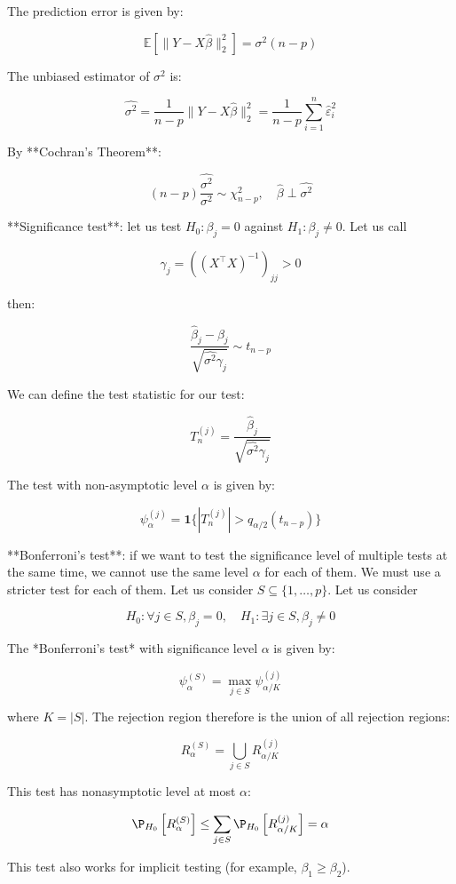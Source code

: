 The prediction error is given by:

$$\mathbb{E}\left[\|Y - X\hat{\beta}\|^2_2\right] = \sigma^2(n - p)$$

The unbiased estimator of $\sigma^2$ is:

$$\hat{\sigma^2} = \frac{1}{n-p}\|Y - X\hat{\beta}\|^2_2 = \frac1{n-p}\sum_{i=1}^n\hat{\varepsilon}_i^2$$

By **Cochran's Theorem**:

$$ (n-p)\frac{\hat{\sigma^2}}{\sigma^2} \sim \chi^2_{n-p}, \quad \hat\beta \perp \hat{\sigma^2}$$

**Significance test**: let us test $H_0: \beta_j = 0$ against $H_1: \beta_j \neq 0$. Let us call

$$\gamma_j = \left((X^\top X)^{-1}\right)_{jj} > 0$$

then:

$$\frac{\hat{\beta}_j- \beta_j}{\sqrt{\hat{\sigma^2}\gamma_j}} \sim t_{n-p}$$

We can define the test statistic for our test:

$$T_n^{(j)} = \frac{\hat{\beta}_j}{\sqrt{\hat{\sigma^2}\gamma_j}}$$

The test with non-asymptotic level $\alpha$ is given by:

$$\psi_\alpha^{(j)} = \textbf{1}\{|T_n^{(j)}| > q_{\alpha/2}(t_{n-p})\}$$

**Bonferroni's test**: if we want to test the significance level of multiple tests at the same time, we cannot use the same level $\alpha$ for each of them. We must use a stricter test for each of them. Let us consider $S \subseteq \{1, \ldots, p\}$. Let us consider

$$H_0: \forall j \in S, \beta_j = 0, \quad H_1: \exists j \in S, \beta_j \neq 0$$

The *Bonferroni's test* with significance level $\alpha$ is given by:

$$\psi_\alpha^{(S)} = \max_{j \in S}\psi_{\alpha/K}^{(j)}$$

where $K = |S|$. The rejection region therefore is the union of all rejection regions:

$$R_\alpha^{(S)} = \bigcup_{j \in S}R_{\alpha/K}^{(j)}$$

This test has nonasymptotic level at most $\alpha$:

$$\P_{H_0}\left[R_\alpha^{(S)}\right] \leq \sum_{j\in S}\P_{H_0}\left[R_{\alpha/K}^{(j)}\right] = \alpha$$

This test also works for implicit testing (for example, $\beta_1 \geq \beta_2$).
